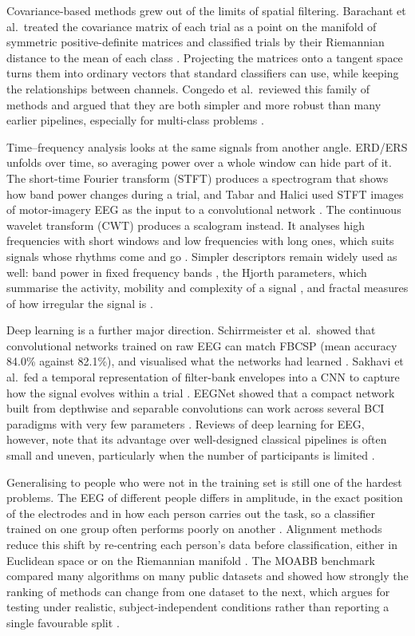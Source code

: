 \documentclass[pdflatex,sn-mathphys-num]{sn-jnl}%
\theoremstyle{thmstyleone}%
\theoremstyle{thmstyletwo}%
\theoremstyle{thmstylethree}%
\begin{document}
Covariance-based methods grew out of the limits of spatial filtering. Barachant et al.\ treated the covariance matrix of each trial as a point on the manifold of symmetric positive-definite matrices and classified trials by their Riemannian distance to the mean of each class \citep{Barachant2012}. Projecting the matrices onto a tangent space turns them into ordinary vectors that standard classifiers can use, while keeping the relationships between channels. Congedo et al.\ reviewed this family of methods and argued that they are both simpler and more robust than many earlier pipelines, especially for multi-class problems \citep{Congedo2017}.

Time--frequency analysis looks at the same signals from another angle. ERD/ERS unfolds over time, so averaging power over a whole window can hide part of it. The short-time Fourier transform (STFT) produces a spectrogram that shows how band power changes during a trial, and Tabar and Halici used STFT images of motor-imagery EEG as the input to a convolutional network \citep{Tabar2017}. The continuous wavelet transform (CWT) produces a scalogram instead. It analyses high frequencies with short windows and low frequencies with long ones, which suits signals whose rhythms come and go \citep{Torrence1998}. Simpler descriptors remain widely used as well: band power in fixed frequency bands \citep{Lotte2014}, the Hjorth parameters, which summarise the activity, mobility and complexity of a signal \citep{Hjorth1970}, and fractal measures of how irregular the signal is \citep{Higuchi1988}.

Deep learning is a further major direction. Schirrmeister et al.\ showed that convolutional networks trained on raw EEG can match FBCSP (mean accuracy 84.0\% against 82.1\%), and visualised what the networks had learned \citep{Schirrmeister2017}. Sakhavi et al.\ fed a temporal representation of filter-bank envelopes into a CNN to capture how the signal evolves within a trial \citep{Sakhavi2018}. EEGNet showed that a compact network built from depthwise and separable convolutions can work across several BCI paradigms with very few parameters \citep{Lawhern2018}. Reviews of deep learning for EEG, however, note that its advantage over well-designed classical pipelines is often small and uneven, particularly when the number of participants is limited \citep{Roy2019,Craik2019,Altaheri2023}.

Generalising to people who were not in the training set is still one of the hardest problems. The EEG of different people differs in amplitude, in the exact position of the electrodes and in how each person carries out the task, so a classifier trained on one group often performs poorly on another \citep{Lotte2018}. Alignment methods reduce this shift by re-centring each person's data before classification, either in Euclidean space \citep{He2020} or on the Riemannian manifold \citep{Zanini2018,Zhang2020}. The MOABB benchmark compared many algorithms on many public datasets and showed how strongly the ranking of methods can change from one dataset to the next, which argues for testing under realistic, subject-independent conditions rather than reporting a single favourable split \citep{Jayaram2018}.
\end{document}
